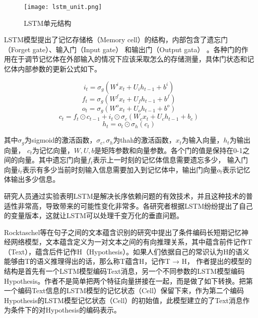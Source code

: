 \begin{figure}[htbp]
	\centering
	\texttt{[image: lstm\_unit.png]}
	\caption[rnn_vanish]{LSTM单元结构}
\end{figure}

LSTM模型提出了记忆存储格（Memory cell）的结构，内部包含了遗忘门（Forget gate）、输入门（Input gate） 和输出门（Output gata） 。各种门的作用在于调节记忆体在外部输入的情况下应该采取怎么的存储测量，具体门状态和记忆体内部参数的更新公式如下。

\begin{equation}\label{lstm_f}i_t=\sigma_g(W^ix_t+U_ih_{t-1}+b^i)\end{equation}
\begin{equation}\label{lstm_f}f_t=\sigma_g(W^fx_t+U_fh_{t-1}+b^f)\end{equation}
\begin{equation}\label{lstm_f}o_t=\sigma_g(W^ox_t+U_oh_{t-1}+b^o)\end{equation}
\begin{equation}\label{lstm_f}c_t=f_t \odot c_{t-1}+i_t\odot \sigma_c(W_cx_t+U_ch_{t-1}+b_c)\end{equation}
\begin{equation}\label{lstm_f}h_t=o_t \odot \sigma_h(c_t)\end{equation}

其中$\sigma_g$为sigmoid的激活函数，$\sigma_c,\sigma_h$为thah的激活函数，$x_t$为输入向量，$h_t$为输出向量， $c_t$为记忆向量，$W,U,b$是矩阵参数和向量参数。各个门的值是保持在0-1之间的向量。其中遗忘门向量$f_t$表示上一时刻的记忆体信息需要遗忘多少， 输入门向量$i_t$表示有多少当前时刻输入信息需要加入到记忆体中，输出门向量$o_t$表示记忆体输出多少信息。

研究人员通过实验表明LSTM是解决长序依赖问题的有效技术，并且这种技术的普适性非常高，导致带来的可能性变化非常多。各研究者根据LSTM纷纷提出了自己的变量版本，这就让LSTM可以处理千变万化的垂直问题。

Rocktaschel等在句子之间的文本蕴含识别的研究中提出了条件编码长短期记忆神经网络模型，文本蕴含定义为一对文本之间的有向推理关系，其中蕴含前件记作T（Text），蕴含后件记作H（Hypothesis）。如果人们依据自己的常识认为H的语义能够由T的语义推理得出的话，那么称T蕴含H，记作T → H， 作者提出的模型的结构是首先有一个LSTM模型编码Text消息，另一个不同参数的LSTM模型编码Hypothesis。作者不是简单把两个特征向量拼接在一起，而是做了如下转换。把第一个编码Text信息的LSTM模型的记忆状态（Cell）保留下来，作为第二个编码Hypothesis的LSTM模型记忆状态（Cell）的初始值，此模型建立的了Text消息作为条件下的对Hypothesis的编码表示。

